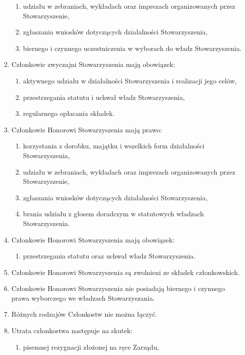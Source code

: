 \documentclass{article}
\begin{document}
\begin{enumerate}
\begin{enumerate}
        \item udziału w zebraniach, wykładach oraz imprezach organizowanych przez Stowarzyszenie,
        \item zgłaszania wniosków dotyczących działalności Stowarzyszenia,
        \item biernego i czynnego uczestniczenia w wyborach do władz Stowarzyszenia.
      \end{enumerate}
    \item Członkowie zwyczajni Stowarzyszenia mają obowiązek:
      \begin{enumerate}
        \item aktywnego udziału w działalności Stowarzyszenia i realizacji jego celów,
        \item przestrzegania statutu i uchwał władz Stowarzyszenia,
        \item regularnego opłacania składek.
      \end{enumerate}
    \item Członkowie Honorowi Stowarzyszenia mają prawo:
      \begin{enumerate}
        \item korzystania z dorobku, majątku i wszelkich form działalności Stowarzyszenia,
        \item udziału w zebraniach, wykładach oraz imprezach organizowanych przez Stowarzyszenie,
        \item zgłaszania wniosków dotyczących działalności Stowarzyszenia,
        \item brania udziału z głosem doradczym w statutowych władzach Stowarzyszenia.
      \end{enumerate}
    \item Członkowie Honorowi Stowarzyszenia mają obowiązek:
      \begin{enumerate}
        \item przestrzegania statutu oraz uchwał władz Stowarzyszenia.
      \end{enumerate}
    \item Członkowie Honorowi Stowarzyszenia są zwolnieni ze składek członkowskich.
    \item Członkowie Honorowi Stowarzyszenia nie posiadają biernego i czynnego prawa wyborczego we władzach Stowarzyszania.
    \item Różnych rodzajów Członkostw nie można łączyć.
    \item Utrata członkostwa następuje na skutek:
      \begin{enumerate}
        \item pisemnej rezygnacji złożonej na ręce Zarządu,

\end{enumerate}
\end{enumerate}
\end{document}
